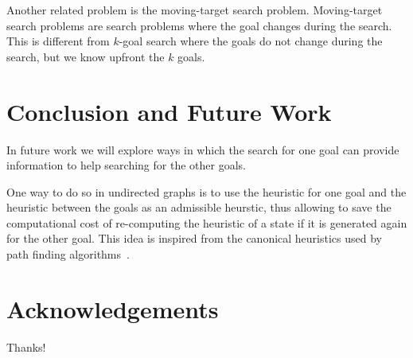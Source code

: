 \documentclass{aicom2e}
\newcommand{\kgs}{$k$-goal search}
\begin{document}
Another related problem is the moving-target search problem. Moving-target search problems are search problems where the goal changes during the search. This is different from \kgs{} where the goals do not change during the search, but we know upfront the $k$ goals. 

\section{Conclusion and Future Work}



In future work we will explore ways in which the search for one goal 
can provide information to help searching for the other goals. 

One way to do so in undirected graphs is to use the heuristic for one goal and the 
heuristic between the goals as an admissible heurstic, thus allowing to save the computational cost of re-computing the heuristic of a state if it is generated again for the other goal. This idea is inspired from the canonical heuristics used by path finding algorithms~\cite{canonical}.




\section*{Acknowledgements}
Thanks!



\end{document}
